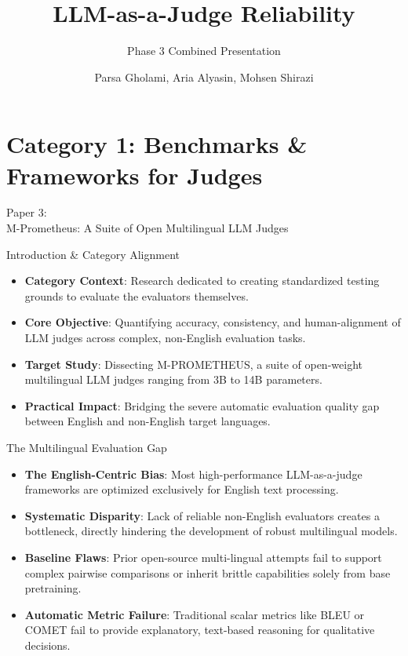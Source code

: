 \documentclass[10pt]{beamer}
\title{LLM-as-a-Judge Reliability}
\subtitle{Phase 3 Combined Presentation}
\date{}
\author{Parsa Gholami, Aria Alyasin, Mohsen Shirazi}
\institute{Sharif University of Technology}
\begin{document}
\maketitle

\section{Category 1: Benchmarks \& Frameworks for Judges}


\begin{frame}[standout]
  \hypertarget{paper3}{}
  \Large Paper 3:\\M-Prometheus: A Suite of Open Multilingual LLM Judges
\end{frame}

\begin{frame}{Introduction \& Category Alignment}
  \begin{itemize}
    \item \textbf{Category Context}: Research dedicated to creating standardized testing grounds to evaluate the evaluators themselves.
    \item \textbf{Core Objective}: Quantifying accuracy, consistency, and human-alignment of LLM judges across complex, non-English evaluation tasks.
    \item \textbf{Target Study}: Dissecting M-PROMETHEUS, a suite of open-weight multilingual LLM judges ranging from 3B to 14B parameters.
    \item \textbf{Practical Impact}: Bridging the severe automatic evaluation quality gap between English and non-English target languages.
  \end{itemize}
\end{frame}

\begin{frame}{The Multilingual Evaluation Gap}
  \begin{itemize}
    \item \textbf{The English-Centric Bias}: Most high-performance LLM-as-a-judge frameworks are optimized exclusively for English text processing.
    \item \textbf{Systematic Disparity}: Lack of reliable non-English evaluators creates a bottleneck, directly hindering the development of robust multilingual models.
    \item \textbf{Baseline Flaws}: Prior open-source multi-lingual attempts fail to support complex pairwise comparisons or inherit brittle capabilities solely from base pretraining.
    \item \textbf{Automatic Metric Failure}: Traditional scalar metrics like BLEU or COMET fail to provide explanatory, text-based reasoning for qualitative decisions.
  \end{itemize}
\end{frame}
\end{document}
